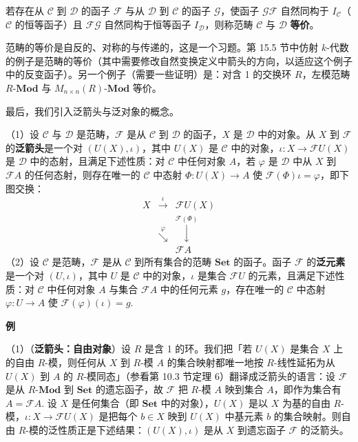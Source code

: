 \begin{definition}
若存在从 \(\mathcal{C}\) 到 \(\mathcal{D}\) 的函子 \(\mathcal{F}\) 与从 \(\mathcal{D}\) 到 \(\mathcal{C}\) 的函子 \(\mathcal{G}\)，使函子 \(\mathcal{GF}\) 自然同构于 \(I_{\mathcal{C}}\)（\(\mathcal{C}\) 的恒等函子）且 \(\mathcal{FG}\) 自然同构于恒等函子 \(I_{\mathcal{D}}\)，则称范畴 \(\mathcal{C}\) 与 \(\mathcal{D}\) \textbf{等价}。
\end{definition}

范畴的等价是自反的、对称的与传递的，这是一个习题。第 15.5 节中仿射 \(k\)-代数的例子是范畴的等价（其中需要修改自然变换定义中箭头的方向，以适应这个例子中的反变函子）。另一个例子（需要一些证明）是：对含 1 的交换环 \(R\)，左模范畴 \(R\text{-}\mathbf{Mod}\) 与 \(M_{n\times n}(R)\text{-}\mathbf{Mod}\) 等价。

最后，我们引入泛箭头与泛对象的概念。

\begin{definition}
（1）设 \(\mathcal{C}\) 与 \(\mathcal{D}\) 是范畴，\(\mathcal{F}\) 是从 \(\mathcal{C}\) 到 \(\mathcal{D}\) 的函子，\(X\) 是 \(\mathcal{D}\) 中的对象。从 \(X\) 到 \(\mathcal{F}\) 的\textbf{泛箭头}是一个对 \((U(X), \iota)\)，其中 \(U(X)\) 是 \(\mathcal{C}\) 中的对象，\(\iota : X \to \mathcal{F}U(X)\) 是 \(\mathcal{D}\) 中的态射，且满足下述性质：对 \(\mathcal{C}\) 中任何对象 \(A\)，若 \(\varphi\) 是 \(\mathcal{D}\) 中从 \(X\) 到 \(\mathcal{F}A\) 的任何态射，则存在唯一的 \(\mathcal{C}\) 中态射 \(\Phi : U(X) \to A\) 使 \(\mathcal{F}(\Phi)\iota = \varphi\)，即下图交换：
\[
\renewcommand{\arraystretch}{1.6}
\begin{array}{ccc}
X & \xrightarrow{\ \iota\ } & \mathcal{F}U(X)\\
 & \mathrel{\mathop{\searrow}\limits^{\scriptstyle \varphi}} & \mathrel{\mathop{\downarrow}\limits^{\scriptstyle \mathcal{F}(\Phi)}}\\
 & & \mathcal{F}A
\end{array}
\]
（2）设 \(\mathcal{C}\) 是范畴，\(\mathcal{F}\) 是从 \(\mathcal{C}\) 到所有集合的范畴 \(\mathbf{Set}\) 的函子。函子 \(\mathcal{F}\) 的\textbf{泛元素}是一个对 \((U, \iota)\)，其中 \(U\) 是 \(\mathcal{C}\) 中的对象，\(\iota\) 是集合 \(\mathcal{F}U\) 的元素，且满足下述性质：对 \(\mathcal{C}\) 中任何对象 \(A\) 与集合 \(\mathcal{F}A\) 中的任何元素 \(g\)，存在唯一的 \(\mathcal{C}\) 中态射 \(\varphi : U \to A\) 使 \(\mathcal{F}(\varphi)(\iota) = g\).
\end{definition}

\noindent\textbf{例}

（1）（\textbf{泛箭头：自由对象}）设 \(R\) 是含 1 的环。我们把「若 \(U(X)\) 是集合 \(X\) 上的自由 \(R\)-模，则任何从 \(X\) 到 \(R\)-模 \(A\) 的集合映射都唯一地按 \(R\)-线性延拓为从 \(U(X)\) 到 \(A\) 的 \(R\)-模同态」（参看第 10.3 节定理 6）翻译成泛箭头的语言：设 \(\mathcal{F}\) 是从 \(R\text{-}\mathbf{Mod}\) 到 \(\mathbf{Set}\) 的遗忘函子，故 \(\mathcal{F}\) 把 \(R\)-模 \(A\) 映到集合 \(A\)，即作为集合有 \(A = \mathcal{F}A\). 设 \(X\) 是任何集合（即 \(\mathbf{Set}\) 中的对象），\(U(X)\) 是以 \(X\) 为基的自由 \(R\)-模，\(\iota : X \to \mathcal{F}U(X)\) 是把每个 \(b \in X\) 映到 \(U(X)\) 中基元素 \(b\) 的集合映射。则自由 \(R\)-模的泛性质正是下述结果：\((U(X), \iota)\) 是从 \(X\) 到遗忘函子 \(\mathcal{F}\) 的泛箭头。

